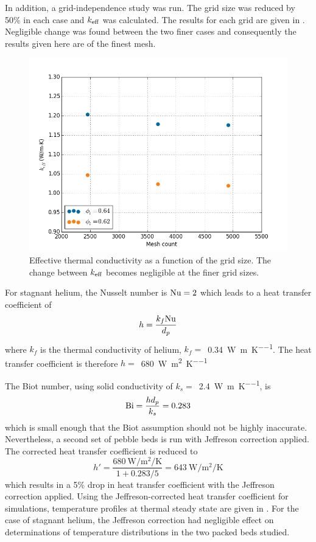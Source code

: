 In addition, a grid-independence study was run. The grid size was reduced by 50\% in each case and $k_\text{eff}$ was calculated. The results for each grid are given in . Negligible change was found between the two finer cases and consequently the results given here are of the finest mesh.

\begin{figure}[ht]
\centering
    \includegraphics[width=\singleimagewidth]{figures/cfd-grid-study.png}
    \caption{Effective thermal conductivity as a function of the grid size. The change between $k_\text{eff}$ becomes negligible at the finer grid sizes.}
    \label{fig:cfd-grid-study}
\end{figure}

For stagnant helium, the Nusselt number is $\mathrm{Nu} = 2$ which leads to a heat transfer coefficient of
\begin{equation}
h = \frac{k_f\mathrm{Nu}}{d_p}
\end{equation}
where $k_f$ is the thermal conductivity of helium, $k_f =$~\SI{0.34}{\watt\per\meter\per\kelvin}. The heat transfer coefficient is therefore $h = $~\SI{680}{\watt\per\meter\squared\per\kelvin}

The Biot number, using solid conductivity of $k_s =$~\SI{2.4}{\watt\per\meter\per\kelvin}, is
\begin{equation}
\mathrm{Bi} = \frac{h d_p}{k_s} = 0.283
\end{equation}
which is small enough that the Biot assumption should not be highly inaccurate. Nevertheless, a second set of pebble beds is run with Jeffreson correction applied. The corrected heat transfer coefficient is reduced to
\begin{equation}
h' = \frac{\SI{680}{\watt\per\meter\squared\per\kelvin}}{1 + 0.283/5} = \SI{643}{\watt\per\meter\squared\per\kelvin}
\end{equation}
which results in a 5\% drop in heat transfer coefficient with the Jeffreson correction applied.
Using the Jeffreson-corrected heat transfer coefficient for simulations, temperature profiles at thermal steady state are given in . For the case of stagnant helium, the Jeffreson correction had negligible effect on determinations of temperature distributions in the two packed beds studied. 

